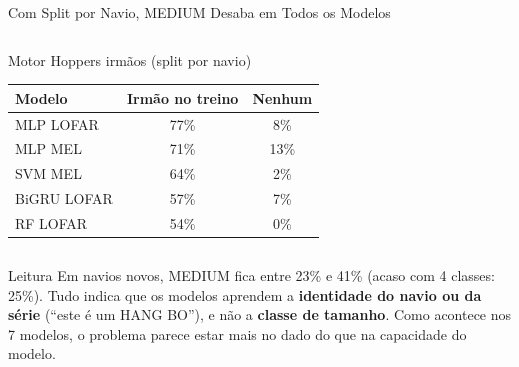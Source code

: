 \documentclass[aspectratio=169]{beamer}
\begin{document}
\begin{frame}{Com Split por Navio, MEDIUM Desaba em Todos os Modelos}
\begin{columns}[t]
\begin{block}{\small Motor Hoppers irmãos (split por navio)}
            \vspace{0.05cm}
            \begin{tabular}{lcc}
            \toprule
            Modelo & Irmão no treino & Nenhum \\
            \midrule
            MLP LOFAR & 77\% & 8\% \\
            MLP MEL & 71\% & 13\% \\
            SVM MEL & 64\% & 2\% \\
            BiGRU LOFAR & 57\% & 7\% \\
            RF LOFAR & 54\% & 0\% \\
            \bottomrule
            \end{tabular}
        \end{block}
    \end{columns}
    \vspace{0.1cm}
    \begin{alertblock}{Leitura}
        \scriptsize
        Em navios novos, MEDIUM fica entre 23\% e 41\% (acaso com 4 classes: 25\%). Tudo indica que os modelos aprendem a \textbf{identidade do navio ou da série} (``este é um HANG BO''), e não a \textbf{classe de tamanho}. Como acontece nos 7 modelos, o problema parece estar mais no dado do que na capacidade do modelo.
    \end{alertblock}
\end{frame}
\end{document}
